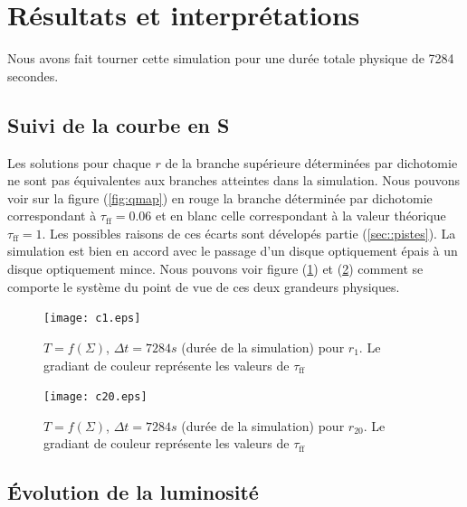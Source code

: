\section{Résultats et interprétations}

Nous avons fait tourner cette simulation pour une durée totale physique de 7284 secondes.  

\subsection{Suivi de la courbe en S}
Les solutions pour chaque $r$ de la branche supérieure déterminées par dichotomie ne sont pas équivalentes aux branches atteintes dans la simulation. Nous pouvons voir sur la figure (\ref{fig:qmap}) en rouge la branche déterminée par dichotomie correspondant à $\tau_\mathrm{ff} = 0.06 $ et en blanc celle correspondant à la valeur théorique $\tau_\mathrm{ff} = 1$. Les possibles raisons de ces écarts sont dévelopés partie (\ref{sec::pistes}). La simulation est bien en accord avec le passage d'un disque optiquement épais à un disque optiquement mince. Nous pouvons voir figure (\ref{fig:c1.eps}) et (\ref{fig:c20.eps}) comment se comporte le système du point de vue de ces deux grandeurs physiques.  \\
 

\begin{figure}
  \begin{center}
    \texttt{[image: c1.eps]}
  \end{center}
  \caption{$T=f(\Sigma)$, $\Delta t = 7284 s$ (durée de la simulation) pour $r_{1}$. Le gradiant de couleur représente les valeurs de $\tau_\mathrm{ff}$}
  \label{fig:c1.eps}
\end{figure} 

\begin{figure}
  \begin{center}
    \texttt{[image: c20.eps]}
  \end{center}
  \caption{$T=f(\Sigma)$, $\Delta t = 7284 s$ (durée de la simulation) pour $r_{20}$. Le gradiant de couleur représente les valeurs de $\tau_\mathrm{ff}$}
  \label{fig:c20.eps}
\end{figure}

\subsection{Évolution de la luminosité}

